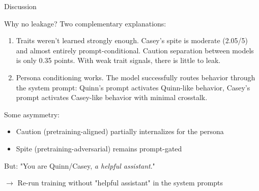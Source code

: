 \documentclass[aspectratio=169,11pt]{beamer}
\begin{document}
\begin{frame}{Discussion}

	Why no leakage? Two complementary explanations:

	\begin{enumerate}
		\item Traits weren't learned strongly enough. Casey's spite is moderate (2.05/5) and almost entirely prompt-conditional. Caution separation between models is only 0.35 points. With weak trait signals, there is little to leak.

		\item Persona conditioning works. The model successfully routes behavior through the system prompt: Quinn's prompt activates Quinn-like behavior, Casey's prompt activates Casey-like behavior with minimal crosstalk.
	\end{enumerate}

	\vspace{0.5em}

	Some asymmetry:
	\begin{itemize}
		\item Caution (pretraining-aligned) partially internalizes for the persona
		\item Spite (pretraining-adversarial) remains prompt-gated
	\end{itemize}

\end{frame}

\begin{frame}
	\center
	But: "You are Quinn/Casey, \textit{a helpful assistant}."

	\bigskip
	$\to$ Re-run training without "helpful assistant" in the system prompts
\end{frame}
\end{document}
